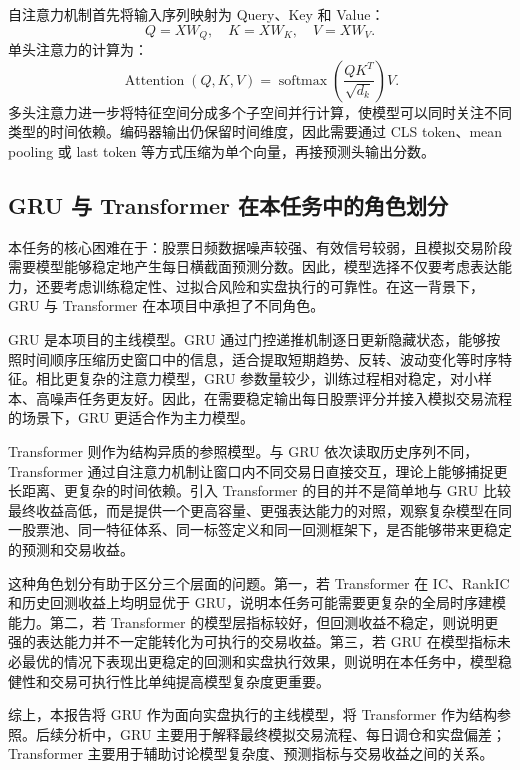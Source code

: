 \documentclass[12pt,a4paper,cn,bibtex]{elegantpaper}
\begin{document}
自注意力机制首先将输入序列映射为 Query、Key 和 Value：
\begin{equation}
    Q = XW_Q, \quad K = XW_K, \quad V = XW_V.
\end{equation}
单头注意力的计算为：
\begin{equation}
    \operatorname{Attention}(Q,K,V) = \operatorname{softmax}\left(\frac{QK^T}{\sqrt{d_k}}\right)V.
\end{equation}
多头注意力进一步将特征空间分成多个子空间并行计算，使模型可以同时关注不同类型的时间依赖。编码器输出仍保留时间维度，因此需要通过 CLS token、mean pooling 或 last token 等方式压缩为单个向量，再接预测头输出分数。

\subsection{GRU 与 Transformer 在本任务中的角色划分}

本任务的核心困难在于：股票日频数据噪声较强、有效信号较弱，且模拟交易阶段需要模型能够稳定地产生每日横截面预测分数。因此，模型选择不仅要考虑表达能力，还要考虑训练稳定性、过拟合风险和实盘执行的可靠性。在这一背景下，GRU 与 Transformer 在本项目中承担了不同角色。

GRU 是本项目的主线模型。GRU 通过门控递推机制逐日更新隐藏状态，能够按照时间顺序压缩历史窗口中的信息，适合提取短期趋势、反转、波动变化等时序特征。相比更复杂的注意力模型，GRU 参数量较少，训练过程相对稳定，对小样本、高噪声任务更友好。因此，在需要稳定输出每日股票评分并接入模拟交易流程的场景下，GRU 更适合作为主力模型。

Transformer 则作为结构异质的参照模型。与 GRU 依次读取历史序列不同，Transformer 通过自注意力机制让窗口内不同交易日直接交互，理论上能够捕捉更长距离、更复杂的时间依赖。引入 Transformer 的目的并不是简单地与 GRU 比较最终收益高低，而是提供一个更高容量、更强表达能力的对照，观察复杂模型在同一股票池、同一特征体系、同一标签定义和同一回测框架下，是否能够带来更稳定的预测和交易收益。

这种角色划分有助于区分三个层面的问题。第一，若 Transformer 在 IC、RankIC 和历史回测收益上均明显优于 GRU，说明本任务可能需要更复杂的全局时序建模能力。第二，若 Transformer 的模型层指标较好，但回测收益不稳定，则说明更强的表达能力并不一定能转化为可执行的交易收益。第三，若 GRU 在模型指标未必最优的情况下表现出更稳定的回测和实盘执行效果，则说明在本任务中，模型稳健性和交易可执行性比单纯提高模型复杂度更重要。

综上，本报告将 GRU 作为面向实盘执行的主线模型，将 Transformer 作为结构参照。后续分析中，GRU 主要用于解释最终模拟交易流程、每日调仓和实盘偏差；Transformer 主要用于辅助讨论模型复杂度、预测指标与交易收益之间的关系。
\end{document}
